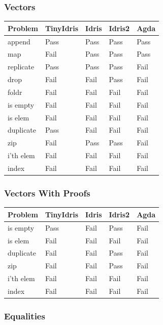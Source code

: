 \documentclass[a4paper]{article}
\begin{document}
\subsubsection{Vectors}
\label{sec:org20404d1}
\begin{center}
\begin{tabular}{lllll}
Problem & TinyIdris & Idris & Idris2 & Agda\\
\hline
append & Pass & Pass & Pass & Pass\\
map & Fail & Pass & Pass & Pass\\
replicate & Pass & Pass & Pass & Fail\\
drop & Fail & Fail & Pass & Fail\\
foldr & Fail & Fail & Fail & Fail\\
is empty & Fail & Fail & Fail & Fail\\
is elem & Fail & Fail & Fail & Fail\\
duplicate & Pass & Fail & Fail & Fail\\
zip & Fail & Pass & Pass & Fail\\
i'th elem & Fail & Fail & Fail & Fail\\
index & Fail & Fail & Fail & Fail\\
\end{tabular}
\end{center}

\subsubsection{Vectors With Proofs}
\label{sec:orge605b92}
\begin{center}
\begin{tabular}{lllll}
Problem & TinyIdris & Idris & Idris2 & Agda\\
\hline
is empty & Pass & Fail & Pass & Fail\\
is elem & Fail & Fail & Fail & Fail\\
duplicate & Fail & Fail & Pass & Fail\\
zip & Fail & Fail & Pass & Fail\\
i'th elem & Fail & Fail & Fail & Fail\\
index & Fail & Fail & Fail & Fail\\
\end{tabular}
\end{center}

\subsubsection{Equalities}
\label{sec:org3daf245}
\end{document}
